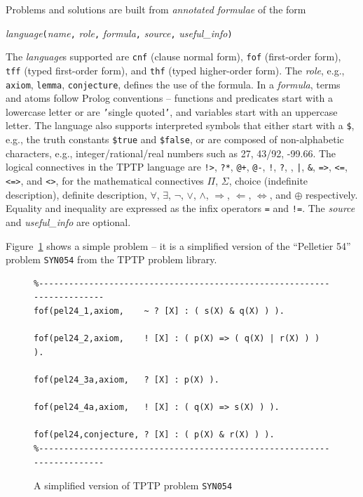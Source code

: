 \documentclass[runningheads]{llncs}
\newcommand{\smalltt}[1]{\small \texttt{#1}}
\begin{document}
Problems and solutions are built from {\em annotated formulae} of the form
\begin{center}
{\em language}{\tt (}{\em name}{\tt ,}
{\em role}{\tt ,}
{\em formula}{\tt ,}
{\em source}{\tt ,}
{\em useful\_info}{\tt )}
\end{center}
The {\em language}s supported are {\smalltt{cnf}} (clause normal form), {\smalltt{fof}}
(first-order form), {\smalltt{tff}} (typed first-order form), and {\smalltt{thf}}
(typed higher-order form).
The {\em role}, e.g., {\smalltt{axiom}}, {\smalltt{lemma}}, {\smalltt{conjecture}}, defines the 
use of the formula.
In a {\em formula}, terms and atoms follow Prolog conventions -- functions and predicates start 
with a lowercase letter or are {\tt '}single quoted{\tt '}, and variables start with an uppercase 
letter.
The language also supports interpreted symbols that either start with a {\tt \$}, e.g., the 
truth constants {\smalltt{\$true}} and {\smalltt{\$false}}, or are composed of 
non-alphabetic characters, e.g., integer/rational/real numbers such as 27, 43/92, -99.66.
The logical connectives in the TPTP language are
{\tt !>}, {\tt ?*}, {\tt @+}, {\tt @-}, {\tt !}, {\tt ?}, {\tt {\raisebox{0.4ex}{\texttildelow}}}, 
{\tt |}, {\tt \&}, {\tt =>}, {\tt <=}, {\tt <=>}, and {\tt <{\raisebox{0.4ex}{\texttildelow}}>},
for the mathematical connectives
$\Pi$, $\Sigma$, choice (indefinite description), definite description,
$\forall$, $\exists$, $\neg$, $\vee$, $\wedge$, $\Rightarrow$, $\Leftarrow$, $\Leftrightarrow$, 
and $\oplus$ respectively.
Equality and inequality are expressed as the infix operators {\tt =} and {\tt !=}.
The {\em source} and {\em useful\_info} are optional.

Figure~\ref{ExampleProblem} shows a simple problem -- it is a simplified version of the
``Pelletier 54'' problem {\tt SYN054} from the TPTP problem library.

\begin{figure}[htb]
\centering
{\footnotesize
{\setlength{\baselineskip}{3mm}
\begin{verbatim}
%------------------------------------------------------------------------
fof(pel24_1,axiom,    ~ ? [X] : ( s(X) & q(X) ) ).

fof(pel24_2,axiom,    ! [X] : ( p(X) => ( q(X) | r(X) ) ) ).

fof(pel24_3a,axiom,   ? [X] : p(X) ).

fof(pel24_4a,axiom,   ! [X] : ( q(X) => s(X) ) ).

fof(pel24,conjecture, ? [X] : ( p(X) & r(X) ) ).
%------------------------------------------------------------------------
\end{verbatim}
}}
\caption{A simplified version of TPTP problem {\tt SYN054}}
\label{ExampleProblem}
\end{figure}
\end{document}
